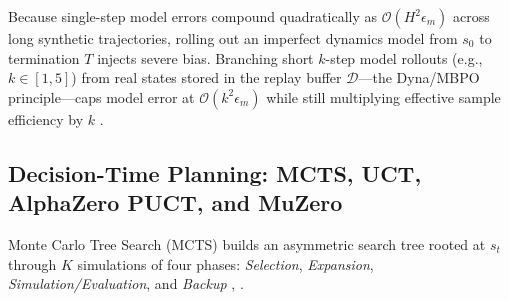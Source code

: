 \documentclass[../../../../master.tex]{subfiles}
\begin{document}
\begin{intuition}
Because single-step model errors compound quadratically as $\mathcal{O}(H^2 \epsilon_m)$ across long synthetic trajectories, rolling out an imperfect dynamics model from $s_0$ to termination $T$ injects severe bias. Branching short $k$-step model rollouts (e.g., $k \in [1, 5]$) from real states stored in the replay buffer $\mathcal{D}$---the Dyna/MBPO principle---caps model error at $\mathcal{O}(k^2 \epsilon_m)$ while still multiplying effective sample efficiency by $k$ .
\end{intuition}

\subsection{Decision-Time Planning: MCTS, UCT, AlphaZero PUCT, and MuZero}
\label{sec:mbrl:mcts}

Monte Carlo Tree Search (MCTS) builds an asymmetric search tree rooted at $s_t$ through $K$ simulations of four phases: \emph{Selection}, \emph{Expansion}, \emph{Simulation/Evaluation}, and \emph{Backup} \newline {}, \newline {}.
\end{document}
